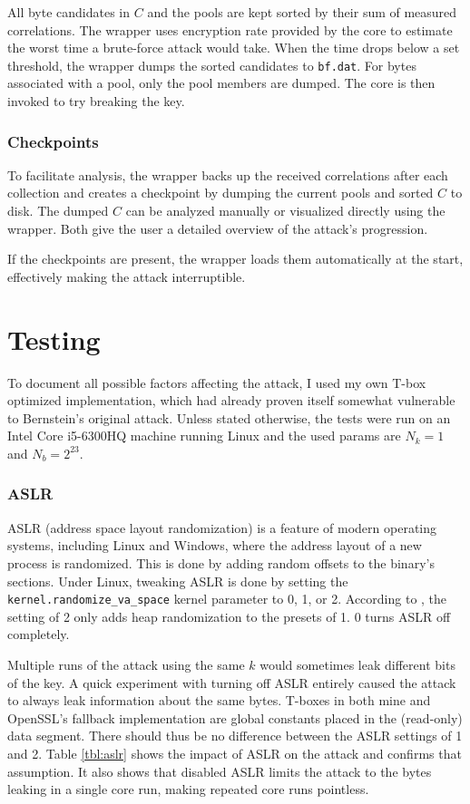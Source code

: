 \documentclass[thesis=B,english]{FITthesis}[2019/03/06]
\begin{document}
All byte candidates in $C$ and the pools are kept sorted by their sum of measured correlations.
The wrapper uses encryption rate provided by the core to estimate the worst time a brute-force attack would take.
When the time drops below a set threshold, the wrapper dumps the sorted candidates to \verb'bf.dat'. For bytes associated with a pool, only the pool members are dumped.
The core is then invoked to try breaking the key.

\subsection{Checkpoints}
To facilitate analysis, the wrapper backs up the received correlations after each collection and creates a checkpoint by dumping the current pools and sorted $C$ to disk.
The dumped $C$ can be analyzed manually or visualized directly using the wrapper. Both give the user a detailed overview of the attack's progression.

If the checkpoints are present, the wrapper loads them automatically at the start, effectively making the attack interruptible.

\chapter{Testing} 
\label{section:testing}
To document all possible factors affecting the attack, I used my own T-box optimized implementation, which had already proven itself somewhat vulnerable to Bernstein's original attack.
Unless stated otherwise, the tests were run on an Intel Core i5-6300HQ machine running Linux and the used params are $N_k = 1$ and $N_b = 2^{23}$.

\subsection{ASLR}
\label{section:aslr}
ASLR (address space layout randomization) is a feature of modern operating systems, including Linux and Windows, where the address layout of a new process is randomized.
This is done by adding random offsets to the binary's sections.
Under Linux, tweaking ASLR is done by setting the \verb'kernel.randomize_va_space' kernel parameter to 0, 1, or 2.
According to \cite{kernelASLR}, the setting of 2 only adds heap randomization to the presets of 1. 0 turns ASLR off completely.

Multiple runs of the attack using the same $k$ would sometimes leak different bits of the key.
A quick experiment with turning off ASLR entirely caused the attack to always leak information about the same bytes.
T-boxes in both mine and OpenSSL's fallback implementation are global constants placed in the (read-only) data segment.
There should thus be no difference between the ASLR settings of 1 and 2.
Table \ref{tbl:aslr} shows the impact of ASLR on the attack and confirms that assumption.
It also shows that disabled ASLR limits the attack to the bytes leaking in a single core run, making repeated core runs pointless.
\end{document}
